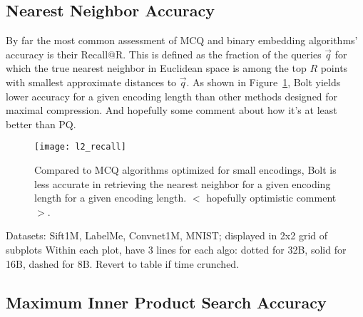 

\subsection{Nearest Neighbor Accuracy}

By far the most common assessment of MCQ and binary embedding algorithms' accuracy is their Recall@R. This is defined as the fraction of the queries $\vec{q}$ for which the true nearest neighbor in Euclidean space is among the top $R$ points with smallest approximate distances to $\vec{q}$. As shown in Figure~\ref{fig:nn_acc}, Bolt yields lower accuracy for a given encoding length than other methods designed for maximal compression. And hopefully some comment about how it's at least better than PQ.

\begin{figure}[h]
\begin{center}
\label{fig:nn_acc}
\texttt{[image: l2\_recall]}
\caption{Compared to MCQ algorithms optimized for small encodings, Bolt is less accurate in retrieving the nearest neighbor for a given encoding length for a given encoding length. $<$ hopefully optimistic comment $>$.}
\end{center}
\end{figure}

Datasets: Sift1M, LabelMe, Convnet1M, MNIST; displayed in 2x2 grid of subplots
Within each plot, have 3 lines for each algo: dotted for 32B, solid for 16B, dashed for 8B.
Revert to table if time crunched.



\subsection{Maximum Inner Product Search Accuracy}

